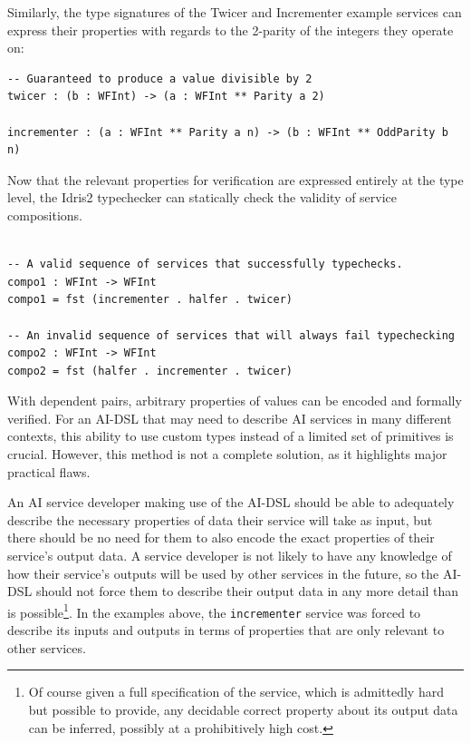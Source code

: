 \documentclass[]{report}
\begin{document}
Similarly, the type signatures of the Twicer and Incrementer example services
can express their properties with regards to the 2-parity of the integers they
operate on:

\begin{verbatim}
-- Guaranteed to produce a value divisible by 2
twicer : (b : WFInt) -> (a : WFInt ** Parity a 2)

incrementer : (a : WFInt ** Parity a n) -> (b : WFInt ** OddParity b n)
\end{verbatim}

Now that the relevant properties for verification are expressed entirely at the
type level, the Idris2 typechecker can statically check the validity of service
compositions.

\begin{verbatim}

-- A valid sequence of services that successfully typechecks.
compo1 : WFInt -> WFInt
compo1 = fst (incrementer . halfer . twicer)

-- An invalid sequence of services that will always fail typechecking
compo2 : WFInt -> WFInt
compo2 = fst (halfer . incrementer . twicer)
\end{verbatim}

With dependent pairs, arbitrary properties of values can be encoded and formally
verified.  For an AI-DSL that may need to describe AI services in many different
contexts, this ability to use custom types instead of a limited set of
primitives is crucial.  However, this method is not a complete solution, as it
highlights major practical flaws.

An AI service developer making use of the AI-DSL should be able to adequately
describe the necessary properties of data their service will take as input, but
there should be no need for them to also encode the exact properties of their
service's output data.  A service developer is not likely to have any knowledge
of how their service's outputs will be used by other services in the future, so
the AI-DSL should not force them to describe their output data in any more
detail than is possible\footnote{Of course given a full specification
of the service, which is admittedly hard but possible to provide, any
decidable correct property about its output data can be inferred,
possibly at a prohibitively high cost.}.  In the examples above,
the \texttt{incrementer} service was forced to describe its inputs and
outputs in terms of properties that are only relevant to other
services.
\end{document}
